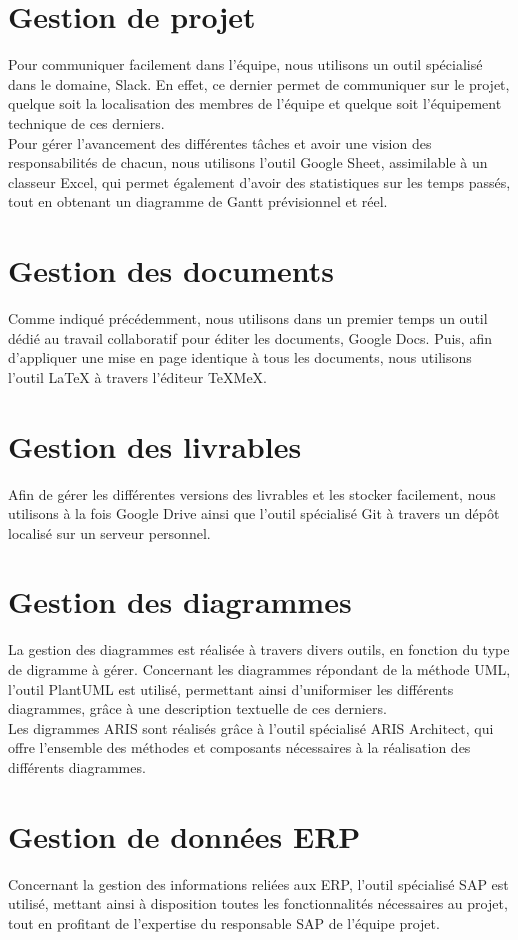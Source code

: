 
\section{Gestion de projet}

Pour communiquer facilement dans l’équipe, nous utilisons un outil spécialisé dans le domaine, Slack. En effet, ce dernier permet de communiquer sur le projet, quelque soit la localisation des membres de l’équipe et quelque soit l’équipement technique de ces derniers. \\

Pour gérer l’avancement des différentes tâches et avoir une vision des responsabilités de chacun, nous utilisons l’outil Google Sheet, assimilable à un classeur Excel, qui permet également d’avoir des statistiques sur les temps passés, tout en obtenant un diagramme de Gantt prévisionnel et réel.

\section{Gestion des documents}

Comme indiqué précédemment, nous utilisons dans un premier temps un outil dédié au travail collaboratif pour éditer les documents, Google Docs. Puis, afin d’appliquer une mise en page identique à tous les documents, nous utilisons l’outil LaTeX à travers l’éditeur TeXMeX.

\section{Gestion des livrables}

Afin de gérer les différentes versions des livrables et les stocker facilement, nous utilisons à la fois Google Drive ainsi que l’outil spécialisé Git à travers un dépôt localisé sur un serveur personnel.

\section{Gestion des diagrammes}

La gestion des diagrammes est réalisée à travers divers outils, en fonction du type de digramme à gérer. Concernant les diagrammes répondant de la méthode UML, l’outil PlantUML est utilisé, permettant ainsi d’uniformiser les différents diagrammes, grâce à une description textuelle de ces derniers. \\

Les digrammes ARIS sont réalisés grâce à l’outil spécialisé ARIS Architect, qui offre l’ensemble des méthodes et composants nécessaires à la réalisation des différents diagrammes.

\section{Gestion de données ERP}

Concernant la gestion des informations reliées aux ERP, l’outil spécialisé SAP est utilisé, mettant ainsi à disposition toutes les fonctionnalités nécessaires au projet, tout en profitant de l’expertise du responsable SAP de l’équipe projet.